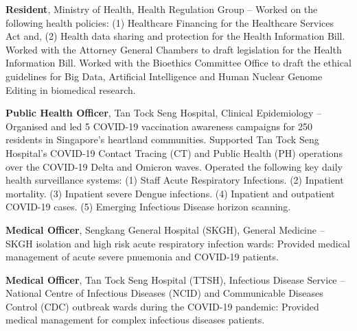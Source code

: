 \documentclass[letterpaper,10pt,oneside]{article}
\begin{document}
\begin{body}
\BigGap
{\textbf{Resident}, Ministry of Health, Health Regulation Group}
\hfill
{} --
\BulletItem
Worked on the following health policies: (1) Healthcare Financing for the Healthcare Services Act and, (2) Health data sharing and protection for the Health Information Bill.
\BulletItem
Worked with the Attorney General Chambers to draft legislation for the Health Information Bill.
\BulletItem
Worked with the Bioethics Committee Office to draft the ethical guidelines for Big Data, Artificial Intelligence and Human Nuclear Genome Editing in biomedical research.

\BigGap
{\textbf{Public Health Officer}, Tan Tock Seng Hospital, Clinical Epidemiology}
\hfill
{} --
\BulletItem
Organised and led 5 COVID-19 vaccination awareness campaigns for 250 residents in Singapore's heartland communities.
\BulletItem
Supported Tan Tock Seng Hospital's COVID-19 Contact Tracing (CT) and Public Health (PH) operations over the COVID-19 Delta and Omicron waves.
\BulletItem
Operated the following key daily health surveillance systems: (1) Staff Acute Respiratory Infections. (2) Inpatient mortality. (3) Inpatient severe Dengue infections. (4) Inpatient and outpatient COVID-19 cases. (5) Emerging Infectious Disease horizon scanning.

\BigGap
{\textbf{Medical Officer}, Sengkang General Hospital (SKGH), General Medicine}
\hfill
{} --
\BulletItem
SKGH isolation and high risk acute respiratory infection wards: Provided medical management of acute severe pnuemonia and COVID-19 patients.

\BigGap
{\textbf{Medical Officer}, Tan Tock Seng Hospital (TTSH), Infectious Disease Service}
\hfill
{} --
\BulletItem
National Centre of Infectious Diseases (NCID) and Communicable Diseases Control (CDC) outbreak wards during the COVID-19 pandemic: Provided medical management for complex infectious diseases patients.





\end{body}
\end{document}

